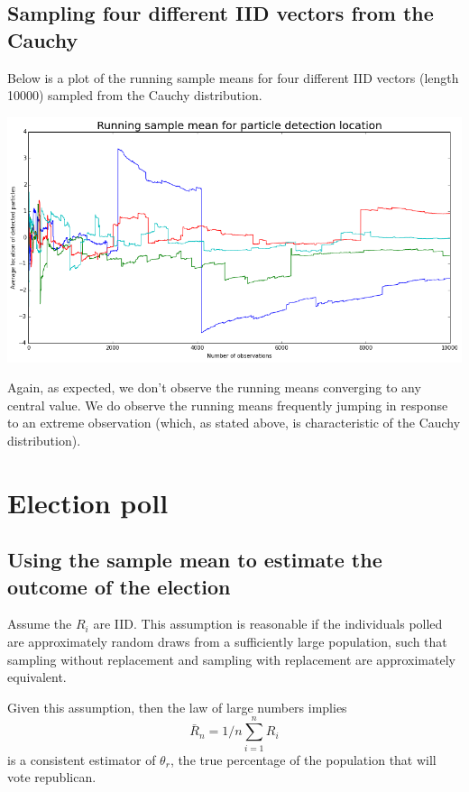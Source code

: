 \documentclass[paper=a4, fontsize=11pt]{scrartcl} %
\numberwithin{equation}{section} %
\numberwithin{figure}{section} %
\numberwithin{table}{section} %
\begin{document}
\subsection{Sampling four different IID vectors from the Cauchy}

Below is a plot of the running sample means for four different IID vectors (length 10000) sampled from the Cauchy distribution.

\includegraphics[scale=0.5]{Q4d_fig}

Again, as expected, we don't observe the running means converging to any central value. We do observe the running means frequently jumping in response to an extreme observation (which, as stated above, is characteristic of the Cauchy distribution).


\section{Election poll}

\subsection{Using the sample mean to estimate the outcome of the election}

Assume the $R_i$ are IID. This assumption is reasonable if the individuals polled are approximately random draws from a sufficiently large population, such that sampling without replacement and sampling with replacement are approximately equivalent.

Given this assumption, then the law of large numbers implies
\[\bar{R}_n = 1/n \sum_{i = 1}^n R_i\]
is a consistent estimator of $\theta_r$, the true percentage of the population that will vote republican.
\end{document}

